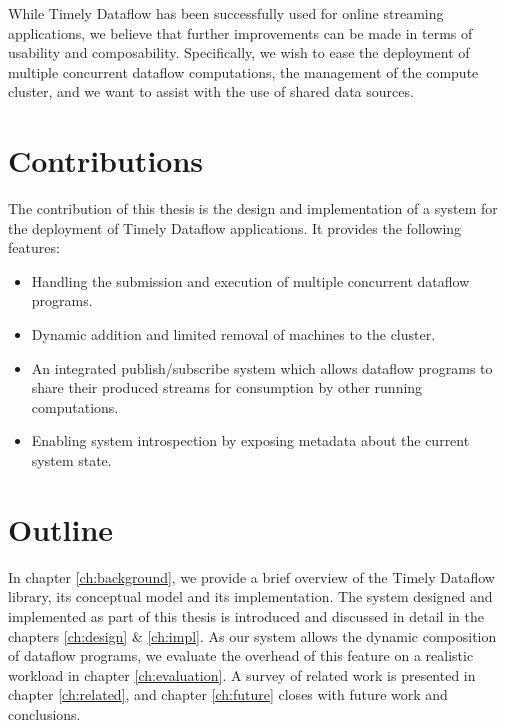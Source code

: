 While Timely Dataflow has been successfully used for online streaming applications,
we believe that further improvements can be made in terms of usability and composability.
Specifically, we wish to ease the deployment of multiple concurrent
dataflow computations, the management of the compute cluster, and we want to
assist with the use of shared data sources.

\section{Contributions}

The contribution of this thesis is the design and implementation of a system
for the deployment of Timely Dataflow applications. It provides the following
features:

\begin{itemize}
\item Handling the submission and execution of multiple concurrent dataflow programs.
\item Dynamic addition and limited removal of machines to the cluster.
\item An integrated publish/subscribe system which allows dataflow programs to share their produced streams
      for consumption by other running computations.
\item Enabling system introspection by exposing metadata about the current system state.
\end{itemize}

\section{Outline}

In chapter \ref{ch:background}, we provide a brief overview of
the Timely Dataflow library, its conceptual model and its implementation. The
system designed and implemented as part of this thesis is introduced and
discussed in detail in the chapters \ref{ch:design} \& \ref{ch:impl}. As our
system allows the dynamic composition of dataflow programs, we evaluate the
overhead of this feature on a realistic workload in chapter \ref{ch:evaluation}.
A survey of related work is presented in chapter \ref{ch:related}, and chapter
\ref{ch:future} closes with future work and conclusions.
